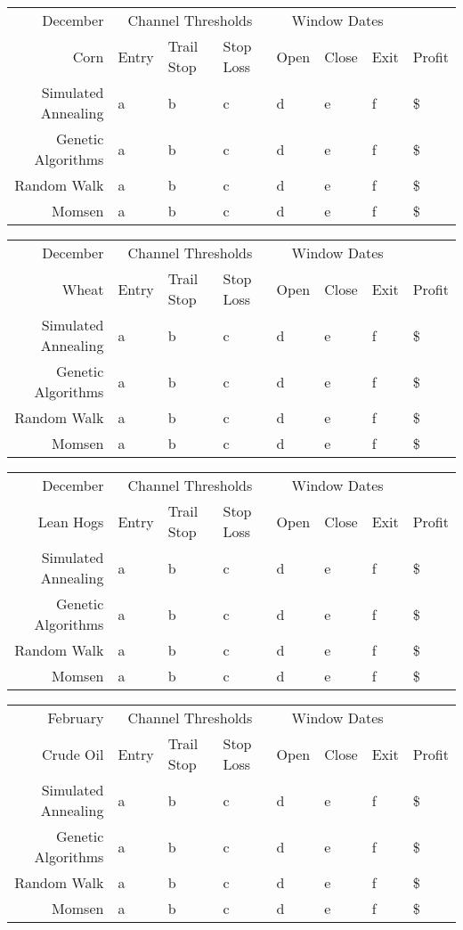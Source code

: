 \documentclass[12pt]{article}
\begin{document}
\begin{tabular}{|r|l|l|l|l|l|l|l|}
  \hline
  December & \multicolumn{3}{|c|}{Channel Thresholds} & \multicolumn{3}{|c|}{Window Dates} &  \\
  Corn & Entry & Trail Stop & Stop Loss & Open & Close & Exit & Profit\\ \hline
  Simulated Annealing & a & b & c & d & e & f & \$ \\ \hline
  Genetic Algorithms & a & b & c & d & e & f & \$ \\ \hline
  Random Walk & a & b & c & d & e & f & \$ \\ \hline
  Momsen &  a & b & c & d & e & f & \$ \\ \hline
\end{tabular}

\begin{tabular}{|r|l|l|l|l|l|l|l|}
  \hline
  December & \multicolumn{3}{|c|}{Channel Thresholds} & \multicolumn{3}{|c|}{Window Dates} &  \\
  Wheat & Entry & Trail Stop & Stop Loss & Open & Close & Exit & Profit\\ \hline
  Simulated Annealing & a & b & c & d & e & f & \$ \\ \hline
  Genetic Algorithms & a & b & c & d & e & f & \$ \\ \hline
  Random Walk & a & b & c & d & e & f & \$ \\ \hline
  Momsen &  a & b & c & d & e & f & \$ \\ \hline
\end{tabular}

\begin{tabular}{|r|l|l|l|l|l|l|l|}
  \hline
  December  & \multicolumn{3}{|c|}{Channel Thresholds} & \multicolumn{3}{|c|}{Window Dates} &  \\
  Lean Hogs & Entry & Trail Stop & Stop Loss & Open & Close & Exit & Profit\\ \hline
  Simulated Annealing & a & b & c & d & e & f & \$ \\ \hline
  Genetic Algorithms & a & b & c & d & e & f & \$ \\ \hline
  Random Walk & a & b & c & d & e & f & \$ \\ \hline
  Momsen &  a & b & c & d & e & f & \$ \\ \hline
\end{tabular}

\begin{tabular}{|r|l|l|l|l|l|l|l|}
  \hline
  February & \multicolumn{3}{|c|}{Channel Thresholds} & \multicolumn{3}{|c|}{Window Dates} &  \\
  Crude Oil & Entry & Trail Stop & Stop Loss & Open & Close & Exit & Profit\\ \hline
  Simulated Annealing & a & b & c & d & e & f & \$ \\ \hline
  Genetic Algorithms & a & b & c & d & e & f & \$ \\ \hline
  Random Walk & a & b & c & d & e & f & \$ \\ \hline
  Momsen &  a & b & c & d & e & f & \$ \\ \hline
\end{tabular}
\end{document}
